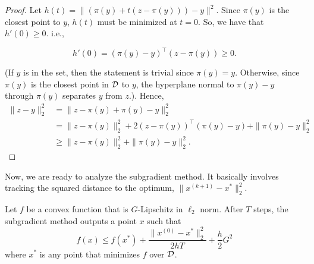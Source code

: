 \begin{proof}
Let $h(t)=\|(\pi(y)+t(z-\pi(y)))-y\|^{2}$. Since $\pi(y)$ is the
closest point to $y$, $h(t)$ must be minimized at $t=0$. So, we
have that $h'(0)\geq0$. i.e.,

\[
h'(0)=(\pi(y)-y)^{\top}(z-\pi(y))\geq0.
\]

(If $y$ is in the set, then the statement is trivial since $\pi(y)=y$.
Otherwise, since $\pi(y)$ is the closest point in ${\cal D}$ to
$y$, the hyperplane normal to $\pi(y)-y$ through $\pi(y)$ separates
$y$ from $z$.). Hence,
\begin{align*}
\|z-y\|_{2}^{2} & =\|z-\pi(y)+\pi(y)-y\|_{2}^{2}\\
 & =\|z-\pi(y)\|_{2}^{2}+2(z-\pi(y))^{\top}(\pi(y)-y)+\|\pi(y)-y\|_{2}^{2}\\
 & \geq\|z-\pi(y)\|_{2}^{2}+\|\pi(y)-y\|_{2}^{2}.
\end{align*}
\end{proof}
Now, we are ready to analyze the subgradient method. It basically
involves tracking the squared distance to the optimum, $\|x^{(k+1)}-x^{*}\|_{2}^{2}$.
\begin{thm}
\label{thm:projected_gradient_descent}Let $f$ be a convex function
that is $G$-Lipschitz in $\ell_{2}$ norm. After $T$ steps, the
subgradient method outputs a point $x$ such that
\[
f(x)\leq f(x^{*})+\frac{\|x^{(0)}-x^{*}\|_{2}^{2}}{2hT}+\frac{h}{2}G^{2}
\]
where $x^{*}$ is any point that minimizes $f$ over ${\cal D}$.
\end{thm}

